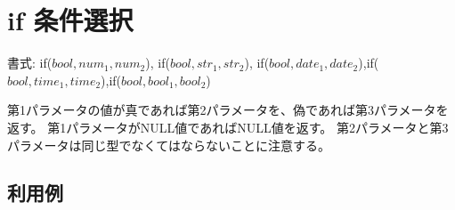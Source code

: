 
%

\section{if 条件選択\label{sect:if}}

書式: if($bool,num_1,num_2$), if($bool,str_1,str_2$), if($bool,date_1,date_2$),if($bool,time_1,time_2$),if($bool,bool_1,bool_2$)

第1パラメータの値が真であれば第2パラメータを、偽であれば第3パラメータを返す。
第1パラメータがNULL値であればNULL値を返す。
第2パラメータと第3パラメータは同じ型でなくてはならないことに注意する。

\subsection*{利用例}


%

